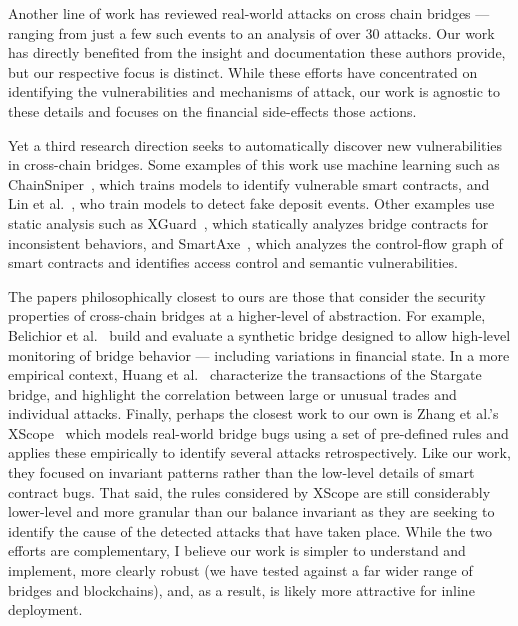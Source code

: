 Another line of work has reviewed real-world attacks on
cross chain
bridges\cite{lee2023sok,zhang2023sok,notland2024sok,zhao2023comprehensive}
--- ranging from just a few such events to an analysis of over 30
attacks.  Our work has directly benefited from the insight and
documentation these authors provide, but our respective focus is
distinct.  While these efforts have concentrated on identifying
the vulnerabilities and mechanisms of attack, our work is
agnostic to these details and focuses on the financial
side-effects those actions.

Yet a third research direction seeks to automatically discover new
vulnerabilities in cross-chain bridges.  Some examples of this work
use machine learning such as ChainSniper~\cite{tran2024chainsniper},
which trains models to identify vulnerable smart contracts, and Lin et
al.~\cite{lin2024detecting}, who train models to detect fake deposit
events.  Other examples use static analysis such as
XGuard~\cite{wang2024xguard}, which statically analyzes bridge
contracts for inconsistent behaviors, and
SmartAxe~\cite{liao2024smartaxe}, which analyzes the control-flow
graph of smart contracts and identifies access control and semantic
vulnerabilities.

The papers philosophically closest to ours are those that consider the
security properties of cross-chain bridges at a higher-level of
abstraction.  For example, Belichior et
al.~\cite{belchior2023hephaestus} build and evaluate a synthetic
bridge designed to allow high-level monitoring of bridge behavior --- including variations in financial state.  In
a more empirical context, Huang et al.~\cite{huang2024seamlessly}
characterize the transactions of the Stargate bridge, and highlight
the correlation between large or unusual trades and individual attacks.  Finally, perhaps the closest work to our own is Zhang et
al.'s XScope~\cite{zhang2022xscope} which models real-world bridge bugs using a set of
pre-defined rules and applies these empirically to identify several attacks retrospectively. Like our work, they focused on invariant patterns rather than the low-level details of
smart contract bugs. 
%
That said, the rules considered by XScope are still considerably lower-level and more granular than our balance invariant as they are seeking to identify the cause of the detected attacks that have taken place.
While the two efforts are complementary, I believe
our work is simpler to understand and implement, more clearly robust
(we have tested against a far wider range of bridges and blockchains),
and, as a result, is likely more attractive for inline deployment.


